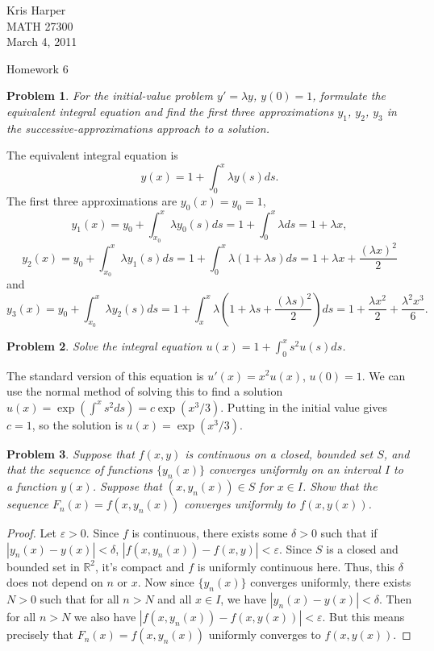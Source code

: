 \documentclass{article}
\newtheorem{problem}{Problem}
\begin{document}
\begin{flushright}
Kris Harper\\

MATH 27300\\

March 4, 2011
\end{flushright}

\begin{center}
Homework 6
\end{center}

\begin{problem}
For the initial-value problem $y' = \lambda y$, $y(0) = 1$, formulate the equivalent integral equation and find the first three approximations $y_1$, $y_2$, $y_3$ in the successive-approximations approach to a solution.
\end{problem}

The equivalent integral equation is
\[
y(x) = 1 + \int_0^x \lambda y(s) ds.
\]
The first three approximations are $y_0(x) = y_0 = 1$,
\[
y_1(x) = y_0 + \int_{x_0}^x \lambda y_0(s) ds = 1 + \int_0^x \lambda ds = 1 + \lambda x,
\]
\[
y_2(x) = y_0 + \int_{x_0}^x \lambda y_1(s) ds = 1 + \int_0^x \lambda (1 + \lambda s) ds = 1 + \lambda x + \frac{(\lambda x)^2}{2}
\]
and
\[
y_3(x) = y_0 + \int_{x_0}^x \lambda y_2(s) ds = 1 + \int_x^x \lambda \left ( 1 + \lambda s + \frac{(\lambda s)^2}{2} \right ) ds = 1 + \frac{\lambda  x^2}{2} + \frac{\lambda ^2 x^3}{6}.
\]

\begin{problem}
Solve the integral equation $u(x) = 1 + \int_0^x s^2 u(s) ds$.
\end{problem}

The standard version of this equation is $u'(x) = x^2 u(x)$, $u(0) = 1$. We can use the normal method of solving this to find a solution $u(x) = \exp \left ( \int^x s^2 ds \right ) = c \exp (x^3/3)$. Putting in the initial value gives $c = 1$, so the solution is $u(x) = \exp (x^3/3)$.

\begin{problem}
Suppose that $f(x,y)$ is continuous on a closed, bounded set $S$, and that the sequence of functions $\{y_n(x)\}$ converges uniformly on an interval $I$ to a function $y(x)$. Suppose that $(x,y_n(x)) \in S$ for $x \in I$. Show that the sequence $F_n(x) = f(x,y_n(x))$ converges uniformly to $f(x,y(x))$.
\end{problem}
\begin{proof}
Let $\varepsilon > 0$. Since $f$ is continuous, there exists some $\delta > 0$ such that if $|y_n(x) - y(x)| < \delta$, $|f(x, y_n(x)) - f(x, y)| < \varepsilon$. Since $S$ is a closed and bounded set in $\mathbb{R}^2$, it's compact and $f$ is uniformly continuous here. Thus, this $\delta$ does not depend on $n$ or $x$. Now since $\{y_n(x)\}$ converges uniformly, there exists $N > 0$ such that for all $n > N$ and all $x \in I$, we have $|y_n(x) - y(x)| < \delta$. Then for all $n > N$ we also have $|f(x, y_n(x)) - f(x, y(x))| < \varepsilon$. But this means precisely that $F_n(x) = f(x, y_n(x))$ uniformly converges to $f(x, y(x))$.
\end{proof}
\end{document}
